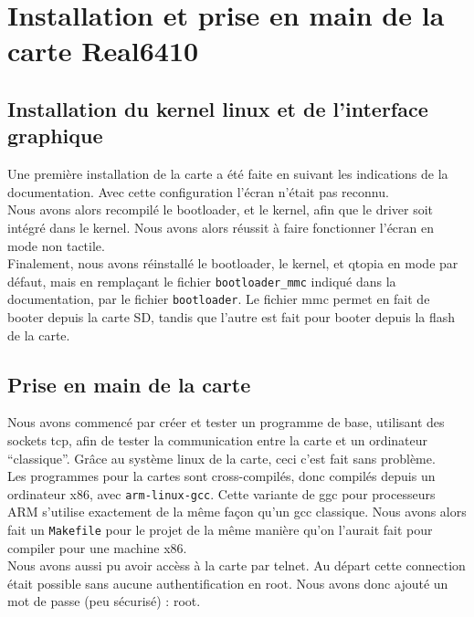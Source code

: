 \documentclass[a4,french,12pt]{article}
\begin{document}
\newpage

\section{Installation et prise en main de la carte Real6410}
\subsection{Installation du kernel linux et de l'interface graphique}
Une première installation de la carte a été faite en suivant les indications de la documentation. Avec cette configuration 
l'écran n'était pas reconnu. \\
Nous avons alors recompilé le bootloader, et le kernel, afin que le driver soit intégré dans le kernel. Nous avons alors 
réussit à faire fonctionner l'écran en mode non tactile. \\
Finalement, nous avons réinstallé le bootloader, le kernel, et qtopia en mode par défaut, mais en remplaçant le fichier 
\texttt{bootloader\_mmc} indiqué dans la documentation, par le fichier \texttt{bootloader}. Le fichier mmc permet en fait de booter depuis la 
carte SD, tandis que l'autre est fait pour booter depuis la flash de la carte. %
\subsection{Prise en main de la carte}
Nous avons commencé par créer et tester un programme de base, utilisant des sockets tcp, afin de tester la communication entre 
la carte et un ordinateur ``classique''. Grâce au système linux de la carte, ceci c'est fait sans problème. \\
Les programmes pour la cartes sont cross-compilés, donc compilés depuis un ordinateur x86, avec \texttt{arm-linux-gcc}. Cette 
variante de ggc pour processeurs ARM s'utilise exactement de la même façon qu'un gcc classique. Nous avons alors fait un 
\texttt{Makefile} pour le projet de la même manière qu'on l'aurait fait pour compiler pour une machine x86. \\
Nous avons aussi pu avoir accèss à la carte par telnet. Au départ cette connection était possible sans aucune authentification 
en root. Nous avons donc ajouté un mot de passe (peu sécurisé) : root.
\end{document}
